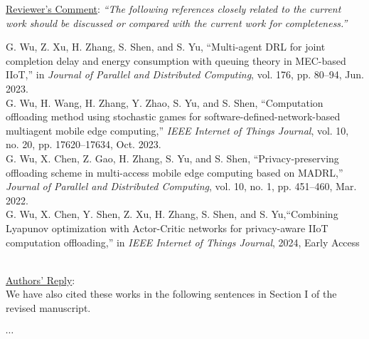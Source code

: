\documentclass[12pt,draftclsnofoot,onecolumn]{IEEEtran}
\newcommand{\rev}[1]{{\color{blue}#1}} %
\newcommand{\rev}[1]{#1}
\newenvironment{my}[2]%
{\begin{list}{}%
{\setlength{\rightmargin}{#1}\setlength{\leftmargin}{#2}}%


 \item[]{}

} {\end{list}}
\begin{document}
\begin{enumerate}
\newpage
	\item \underline{Reviewer's Comment}: 
	\textit{``The following references closely related to the current work should be discussed or compared with the current work for completeness.''} \newline
		\begin{my}{1cm}{1cm}
		\rev{
			{\small
				\noindent\cite{b35} G. Wu, Z. Xu, H. Zhang, S. Shen, and S. Yu,  ``Multi-agent DRL for joint completion delay and energy consumption with queuing theory in MEC-based IIoT,'' in \textit{Journal of Parallel and Distributed Computing}, vol. 176, pp. 80–94, Jun. 2023.\\[6pt]
				\cite{b38} G. Wu, H. Wang, H. Zhang, Y. Zhao, S. Yu, and S. Shen, ``Computation offloading method using stochastic games for software-defined-network-based multiagent mobile edge computing,'' \textit{IEEE Internet of Things Journal}, vol. 10, no. 20, pp. 17620–17634, Oct. 2023.\\[6pt]
				\cite{b37} G. Wu, X. Chen, Z. Gao, H. Zhang, S. Yu, and S. Shen, ``Privacy-preserving offloading scheme in multi-access mobile edge computing based on MADRL,'' \textit{Journal of Parallel and Distributed Computing}, vol. 10, no. 1, pp. 451--460, Mar. 2022.\\[6pt]
				\cite{b39} G. Wu, X. Chen, Y. Shen, Z. Xu, H. Zhang, S. Shen, and S. Yu,``Combining Lyapunov optimization with Actor-Critic networks for privacy-aware IIoT computation offloading,'' in \textit{IEEE Internet of Things Journal}, 2024, Early Access\\[10pt]}\\}
	\end{my}

	
	\underline{Authors' Reply}:\\
	
	We have also cited these works in the following sentences in Section I of the revised manuscript.\\

\begin{my}{1cm}{1cm}
	\rev{
		
		
		$\cdots$
		
	
		}
\end{my}
	
\end{enumerate}

\newpage
\end{document}

